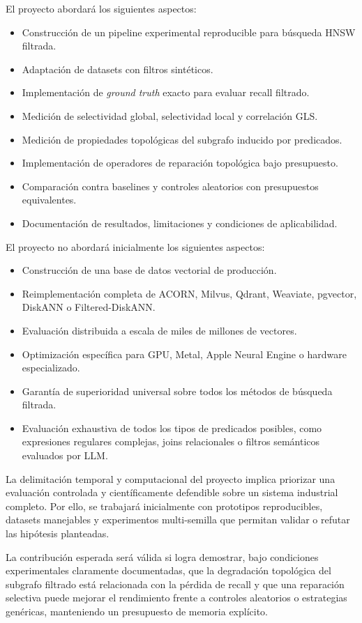 El proyecto abordará los siguientes aspectos:
\begin{itemize}
    \item Construcción de un pipeline experimental reproducible para búsqueda HNSW filtrada.
    \item Adaptación de datasets con filtros sintéticos.
    \item Implementación de \textit{ground truth} exacto para evaluar recall filtrado.
    \item Medición de selectividad global, selectividad local y correlación GLS.
    \item Medición de propiedades topológicas del subgrafo inducido por predicados.
    \item Implementación de operadores de reparación topológica bajo presupuesto.
    \item Comparación contra baselines y controles aleatorios con presupuestos equivalentes.
    \item Documentación de resultados, limitaciones y condiciones de aplicabilidad.
\end{itemize}

El proyecto no abordará inicialmente los siguientes aspectos:
\begin{itemize}
    \item Construcción de una base de datos vectorial de producción.
    \item Reimplementación completa de ACORN, Milvus, Qdrant, Weaviate, pgvector, DiskANN o Filtered-DiskANN.
    \item Evaluación distribuida a escala de miles de millones de vectores.
    \item Optimización específica para GPU, Metal, Apple Neural Engine o hardware especializado.
    \item Garantía de superioridad universal sobre todos los métodos de búsqueda filtrada.
    \item Evaluación exhaustiva de todos los tipos de predicados posibles, como expresiones regulares complejas, joins relacionales o filtros semánticos evaluados por LLM.
\end{itemize}

La delimitación temporal y computacional del proyecto implica priorizar una evaluación controlada y científicamente defendible sobre un sistema industrial completo. Por ello, se trabajará inicialmente con prototipos reproducibles, datasets manejables y experimentos multi-semilla que permitan validar o refutar las hipótesis planteadas.

La contribución esperada será válida si logra demostrar, bajo condiciones experimentales claramente documentadas, que la degradación topológica del subgrafo filtrado está relacionada con la pérdida de recall y que una reparación selectiva puede mejorar el rendimiento frente a controles aleatorios o estrategias genéricas, manteniendo un presupuesto de memoria explícito.
